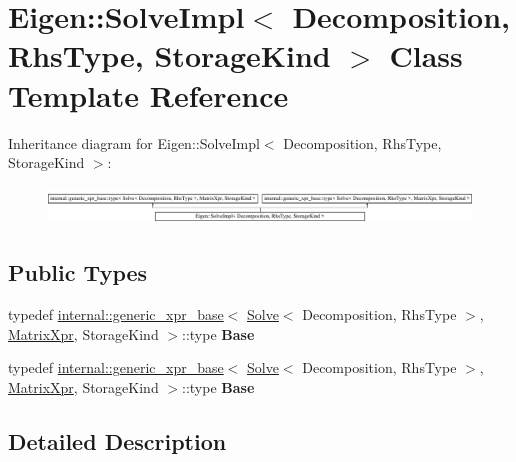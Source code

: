 \hypertarget{class_eigen_1_1_solve_impl}{}\section{Eigen\+:\+:Solve\+Impl$<$ Decomposition, Rhs\+Type, Storage\+Kind $>$ Class Template Reference}
\label{class_eigen_1_1_solve_impl}
Inheritance diagram for Eigen\+:\+:Solve\+Impl$<$ Decomposition, Rhs\+Type, Storage\+Kind $>$\+:\begin{figure}[H]
\begin{center}
\leavevmode
\includegraphics[height=0.994671cm]{class_eigen_1_1_solve_impl}
\end{center}
\end{figure}
\subsection*{Public Types}
\begin{DoxyCompactItemize}
\item 
\mbox{\label{class_eigen_1_1_solve_impl_a52e8597ff3f81c473f7890daa1b317a5}} 
typedef \hyperlink{struct_eigen_1_1internal_1_1generic__xpr__base}{internal\+::generic\+\_\+xpr\+\_\+base}$<$ \hyperlink{group___core___module_class_eigen_1_1_solve}{Solve}$<$ Decomposition, Rhs\+Type $>$, \hyperlink{struct_eigen_1_1_matrix_xpr}{Matrix\+Xpr}, Storage\+Kind $>$\+::type {\bfseries Base}
\item 
\mbox{\label{class_eigen_1_1_solve_impl_a52e8597ff3f81c473f7890daa1b317a5}} 
typedef \hyperlink{struct_eigen_1_1internal_1_1generic__xpr__base}{internal\+::generic\+\_\+xpr\+\_\+base}$<$ \hyperlink{group___core___module_class_eigen_1_1_solve}{Solve}$<$ Decomposition, Rhs\+Type $>$, \hyperlink{struct_eigen_1_1_matrix_xpr}{Matrix\+Xpr}, Storage\+Kind $>$\+::type {\bfseries Base}
\end{DoxyCompactItemize}


\subsection{Detailed Description}

